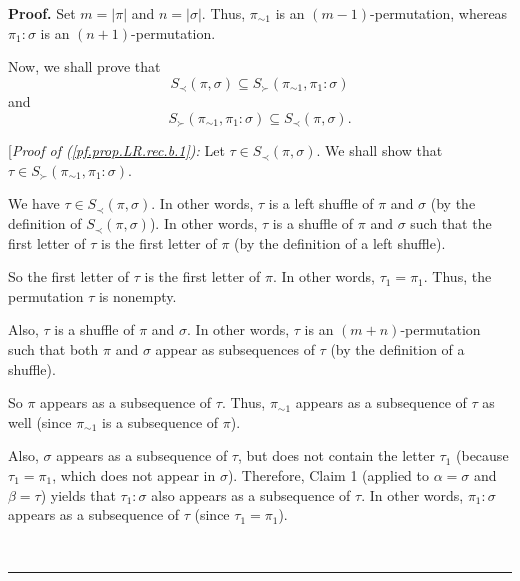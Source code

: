 \documentclass[numbers=enddot,12pt,final,onecolumn,notitlepage]{scrartcl}%
\theoremstyle{definition}
\newenvironment{proof}[1][Proof]{\noindent\textbf{#1.} }{\ \rule{0.5em}{0.5em}}
\begin{document}
\begin{proof}
Set $m=\left\vert \pi\right\vert $ and $n=\left\vert \sigma\right\vert $.
Thus, $\pi_{\sim1}$ is an $\left(  m-1\right)  $-permutation, whereas $\pi
_{1}:\sigma$ is an $\left(  n+1\right)  $-permutation.

Now, we shall prove that%
\begin{equation}
S_{\prec}\left(  \pi,\sigma\right)  \subseteq S_{\succ}\left(  \pi_{\sim1}%
,\pi_{1}:\sigma\right)  \label{pf.prop.LR.rec.b.1}%
\end{equation}
and%
\begin{equation}
S_{\succ}\left(  \pi_{\sim1},\pi_{1}:\sigma\right)  \subseteq S_{\prec}\left(
\pi,\sigma\right)  . \label{pf.prop.LR.rec.b.2}%
\end{equation}


[\textit{Proof of (\ref{pf.prop.LR.rec.b.1}):} Let $\tau\in S_{\prec}\left(
\pi,\sigma\right)  $. We shall show that $\tau\in S_{\succ}\left(  \pi_{\sim
1},\pi_{1}:\sigma\right)  $.

We have $\tau\in S_{\prec}\left(  \pi,\sigma\right)  $. In other words, $\tau$
is a left shuffle of $\pi$ and $\sigma$ (by the definition of $S_{\prec
}\left(  \pi,\sigma\right)  $). In other words, $\tau$ is a shuffle of $\pi$
and $\sigma$ such that the first letter of $\tau$ is the first letter of $\pi$
(by the definition of a left shuffle).

So the first letter of $\tau$ is the first letter of $\pi$. In other words,
$\tau_{1}=\pi_{1}$. Thus, the permutation $\tau$ is nonempty.

Also, $\tau$ is a shuffle of $\pi$ and $\sigma$. In other words, $\tau$ is an
$\left(  m+n\right)  $-permutation such that both $\pi$ and $\sigma$ appear as
subsequences of $\tau$ (by the definition of a shuffle).

So $\pi$ appears as a subsequence of $\tau$. Thus, $\pi_{\sim1}$ appears as a
subsequence of $\tau$ as well (since $\pi_{\sim1}$ is a subsequence of $\pi$).

Also, $\sigma$ appears as a subsequence of $\tau$, but does not contain the
letter $\tau_{1}$ (because $\tau_{1}=\pi_{1}$, which does not appear in
$\sigma$). Therefore, Claim 1 (applied to $\alpha=\sigma$ and $\beta=\tau$)
yields that $\tau_{1}:\sigma$ also appears as a subsequence of $\tau$. In
other words, $\pi_{1}:\sigma$ appears as a subsequence of $\tau$ (since
$\tau_{1}=\pi_{1}$).


\end{proof}
\end{document}
